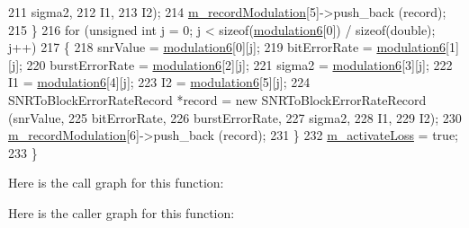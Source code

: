 \begin{DoxyCode}
211                                                                          sigma2,
212                                                                          I1,
213                                                                          I2);
214       \hyperlink{classns3_1_1SNRToBlockErrorRateManager_af74c812f3b0a25252f2897aadea6898e}{m\_recordModulation}[5]->push\_back (record);
215     \}
216   \textcolor{keywordflow}{for} (\textcolor{keywordtype}{unsigned} \textcolor{keywordtype}{int} j = 0; j < \textcolor{keyword}{sizeof}(\hyperlink{classns3_1_1SNRToBlockErrorRateManager_abd73becdc6070587be5ddd2ce88959f8}{modulation6}[0]) / \textcolor{keyword}{sizeof}(\textcolor{keywordtype}{double}); j++)
217     \{
218       snrValue = \hyperlink{classns3_1_1SNRToBlockErrorRateManager_abd73becdc6070587be5ddd2ce88959f8}{modulation6}[0][j];
219       bitErrorRate = \hyperlink{classns3_1_1SNRToBlockErrorRateManager_abd73becdc6070587be5ddd2ce88959f8}{modulation6}[1][j];
220       burstErrorRate = \hyperlink{classns3_1_1SNRToBlockErrorRateManager_abd73becdc6070587be5ddd2ce88959f8}{modulation6}[2][j];
221       sigma2 = \hyperlink{classns3_1_1SNRToBlockErrorRateManager_abd73becdc6070587be5ddd2ce88959f8}{modulation6}[3][j];
222       I1 = \hyperlink{classns3_1_1SNRToBlockErrorRateManager_abd73becdc6070587be5ddd2ce88959f8}{modulation6}[4][j];
223       I2 = \hyperlink{classns3_1_1SNRToBlockErrorRateManager_abd73becdc6070587be5ddd2ce88959f8}{modulation6}[5][j];
224       SNRToBlockErrorRateRecord *record = \textcolor{keyword}{new} SNRToBlockErrorRateRecord (snrValue,
225                                                                          bitErrorRate,
226                                                                          burstErrorRate,
227                                                                          sigma2,
228                                                                          I1,
229                                                                          I2);
230       \hyperlink{classns3_1_1SNRToBlockErrorRateManager_af74c812f3b0a25252f2897aadea6898e}{m\_recordModulation}[6]->push\_back (record);
231     \}
232   \hyperlink{classns3_1_1SNRToBlockErrorRateManager_ac12a64ac423a9051a6f2cebf82fb3259}{m\_activateLoss} = \textcolor{keyword}{true};
233 \}
\end{DoxyCode}


Here is the call graph for this function\+:




Here is the caller graph for this function\+:


